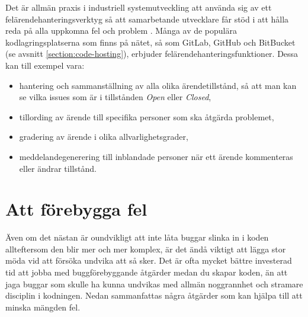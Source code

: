Det är allmän praxis i industriell systemutveckling att använda sig av ett felärendehanteringsverktyg  så att samarbetande utvecklare får stöd i att hålla reda på alla uppkomna fel och problem . Många av de populära kodlagringsplatserna som finns på nätet, så som GitLab, GitHub och BitBucket (se avsnitt \ref{section:code-hosting}), erbjuder felärendehanteringsfunktioner. Dessa kan till exempel vara:
\begin{itemize}
\item hantering och sammanställning av alla olika ärendetillstånd, så att man kan se vilka issues som är i tillstånden \textit{Open} eller \textit{Closed},
\item tillording av ärende till specifika personer som ska åtgärda problemet,
\item gradering av ärende i olika allvarlighetsgrader,
\item meddelandegenerering till inblandade personer när ett ärende kommenteras eller ändrar tillstånd.
\end{itemize}


\section{Att förebygga fel}

Även om det nästan är oundvikligt att inte låta buggar slinka in i koden allteftersom den blir mer och mer komplex, är det ändå viktigt att lägga stor möda vid att försöka undvika att så sker. Det är ofta mycket bättre investerad tid att jobba med buggförebyggande åtgärder medan du skapar koden, än att jaga buggar som skulle ha kunna undvikas med allmän noggrannhet och stramare disciplin i kodningen. Nedan sammanfattas några åtgärder som kan hjälpa till att minska mängden fel.

